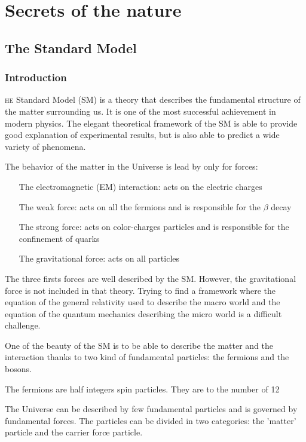 \chapter{Secrets of the nature}

  \section{The Standard Model}

    \subsection{Introduction}
    
    \lettrine{}{he} Standard Model (SM) is a theory that describes the fundamental structure of the matter surrounding us. 
    It is one of the most successful achievement in modern physics.
    The elegant theoretical framework of the SM is able to provide good explanation of experimental results, but is also able to predict a wide variety of phenomena.

    The behavior of the matter in the Universe is lead by only for forces:
    \begin{itemize}
        \item[The electromagnetic (EM) interaction:] acts on the electric charges
        \item[The weak force:] acts on all the fermions and is responsible for the $\beta$ decay
        \item[The strong force:] acts on color-charges particles and is responsible for the confinement of quarks
        \item[The gravitational force:] acts on all particles
    \end{itemize}

    The three firsts forces are well described by the SM.
    However, the gravitational force is not included in that theory. 
    Trying to find a framework where the equation of the general relativity used to describe the macro world and the equation of the quantum mechanics describing the micro world is a difficult challenge.
    
    One of the beauty of the SM is to be able to describe the matter and the interaction thanks to two kind of fundamental particles: the fermions and the bosons.

    The fermions are half integers spin particles. They are to the number of 12


    The Universe can be described by few fundamental particles and is governed by fundamental forces. The particles can be divided in two categories: the 'matter' particle and the carrier force particle. 

